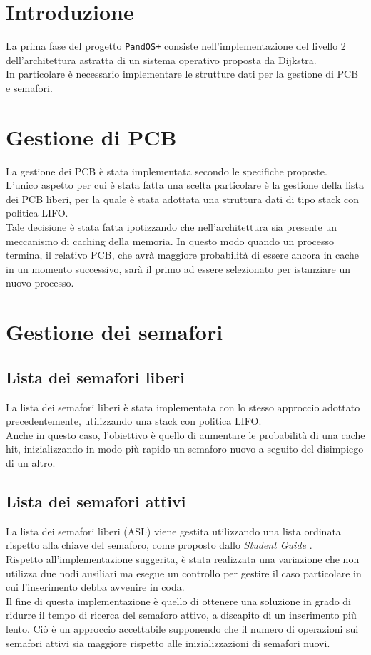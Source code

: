 \documentclass[11pt]{article}
\begin{document}
\newpage

\section{Introduzione}
La prima fase del progetto \texttt{PandOS+} consiste nell'implementazione del livello 2 dell'architettura astratta di un sistema operativo proposta da Dijkstra.\\
In particolare è necessario implementare le strutture dati per la gestione di PCB e semafori.

\section{Gestione di PCB}
La gestione dei PCB è stata implementata secondo le specifiche proposte. \\
L'unico aspetto per cui è stata fatta una scelta particolare è la gestione della lista dei PCB liberi, per la quale è stata adottata una struttura dati di tipo stack con politica LIFO.\\
Tale decisione è stata fatta ipotizzando che nell'architettura sia presente un meccanismo di caching della memoria. In questo modo quando un processo termina, 
il relativo PCB, che avrà maggiore probabilità di essere ancora in cache in un momento successivo, sarà il primo ad essere selezionato per istanziare un nuovo processo.

\section{Gestione dei semafori}
\subsection{Lista dei semafori liberi}
La lista dei semafori liberi è stata implementata con lo stesso approccio adottato precedentemente, utilizzando una stack con politica LIFO. \\
Anche in questo caso, l'obiettivo è quello di aumentare le probabilità di una cache hit, inizializzando in modo più rapido un semaforo nuovo a seguito del disimpiego di un altro.

\subsection{Lista dei semafori attivi}
La lista dei semafori liberi (ASL) viene gestita utilizzando una lista ordinata rispetto alla chiave del semaforo, come proposto dallo \textit{Student Guide} \cite{1}. \\
Rispetto all'implementazione suggerita, è stata realizzata una variazione che non utilizza due nodi ausiliari ma esegue un controllo per gestire il caso particolare in cui l'inserimento debba avvenire in coda.\\
Il fine di questa implementazione è quello di ottenere una soluzione in grado di ridurre il tempo di ricerca del semaforo attivo, a discapito di un inserimento più lento.
Ciò è un approccio accettabile supponendo che il numero di operazioni sui semafori attivi sia maggiore rispetto alle inizializzazioni di semafori nuovi.

\newpage
\printbibliography[title={Bibliografia}]
\end{document}
